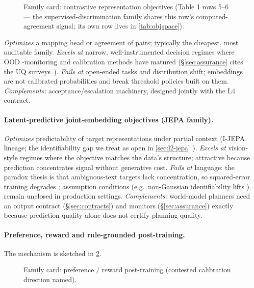\documentclass[11pt]{article}
\begin{document}
\begin{figure}[t]\centering
  \resizebox{\linewidth}{!}{}
  \caption{Family card: contrastive representation objectives (Table 1 rows 5--6 --- the supervised-discrimination family shares this row's computed-agreement signal; its own row lives in \cref{tab:objspace}).}
  \label{fig:fam-contrastive}
\end{figure}

\textit{Optimizes} a mapping head or agreement of pairs; typically the cheapest, most
auditable family. \textit{Excels at} narrow, well-instrumented decision regimes where OOD
-monitoring and calibration methods have matured (\S\ref{sec:assurance} cites the UQ
 surveys~\cite{id250315850,id240718418}). \textit{Fails at} open-ended tasks and
distribution shift; embeddings are not calibrated probabilities and break
threshold policies built on them. \textit{Complements:} acceptance/escalation
machinery, designed jointly with the L4 contract.

\paragraph{Latent-predictive joint-embedding objectives (JEPA family).}
\textit{Optimizes} predictability of target representations under partial context
(I-JEPA lineage; the identifiability gap we treat as open in \cref{sec:l2-jepa}
\cite{klindt2026lejepa}). \textit{Excels at} vision-style regimes where the objective matches the
data's structure; attractive because prediction concentrates signal without generative cost.
\textit{Fails at} language: the paradox thesis is that ambiguous-text targets lack
concentration, so squared-error training degrades \cite{identifiability2026};
assumption conditions (e.g.\ non-Gaussian identifiability lifts \cite{id260612471}) remain
unclosed in production settings. \textit{Complements:} world-model planners need an output
contract (\S\ref{sec:contracts}) and monitors (\S\ref{sec:assurance}) exactly because prediction
quality alone does not certify planning quality.

\paragraph{Preference, reward and rule-grounded post-training.}
\noindent The mechanism is sketched in \cref{fig:fam-preference}.

\begin{figure}[t]\centering
  \resizebox{\linewidth}{!}{}
  \caption{Family card: preference / reward post-training (contested calibration direction named).}
  \label{fig:fam-preference}
\end{figure}
\end{document}
